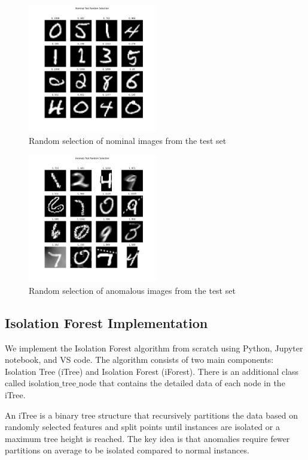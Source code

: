 \begin{figure}[htbp]
\centering
\includegraphics[width=0.5\textwidth]{resources/images/_nominal_test_random_selection.png}
\caption{Random selection of nominal images from the test set}
\label{fig:nominal_test}
\end{figure}

\begin{figure}[htbp]
\centering
\includegraphics[width=0.5\textwidth]{resources/images/_anomaly_test_random_selection.png}
\caption{Random selection of anomalous images from the test set}
\label{fig:anomaly_test}
\end{figure}

\subsection{Isolation Forest Implementation}
We implement the Isolation Forest algorithm from scratch using Python, Jupyter notebook, and VS code. The algorithm consists of two main components: Isolation Tree (iTree) and Isolation Forest (iForest). There is an additional class called isolation$\_$tree$\_$node that contains the detailed data of each node in the iTree.

An iTree is a binary tree structure that recursively partitions the data based on randomly selected features and split points until instances are isolated or a maximum tree height is reached. The key idea is that anomalies require fewer partitions on average to be isolated compared to normal instances.

